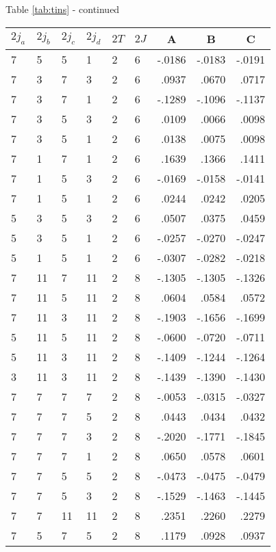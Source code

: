 \begin{center}{Table \ref{tab:tins} - continued}\end{center}
\clearpage
\small
\begin{center}
\begin{tabular}{llllllrrr}
\hline
$2j_{a}$&$2j_{b}$&$2j_{c}$&$2j_{d}$&$2T$&$2J$&
\multicolumn{1}{c}{A}&
\multicolumn{1}{c}{B}&
\multicolumn{1}{c}{C}
\\\hline
  7& 5& 5& 1& 2& 6&  -.0186&  -.0183&  -.0191\\
  7& 3& 7& 3& 2& 6&   .0937&   .0670&   .0717\\
  7& 3& 7& 1& 2& 6&  -.1289&  -.1096&  -.1137\\
  7& 3& 5& 3& 2& 6&   .0109&   .0066&   .0098\\
  7& 3& 5& 1& 2& 6&   .0138&   .0075&   .0098\\
  7& 1& 7& 1& 2& 6&   .1639&   .1366&   .1411\\
  7& 1& 5& 3& 2& 6&  -.0169&  -.0158&  -.0141\\
  7& 1& 5& 1& 2& 6&   .0244&   .0242&   .0205\\
  5& 3& 5& 3& 2& 6&   .0507&   .0375&   .0459\\
  5& 3& 5& 1& 2& 6&  -.0257&  -.0270&  -.0247\\
  5& 1& 5& 1& 2& 6&  -.0307&  -.0282&  -.0218\\
  7&11& 7&11& 2& 8&  -.1305&  -.1305&  -.1326\\
  7&11& 5&11& 2& 8&   .0604&   .0584&   .0572\\
  7&11& 3&11& 2& 8&  -.1903&  -.1656&  -.1699\\
  5&11& 5&11& 2& 8&  -.0600&  -.0720&  -.0711\\
  5&11& 3&11& 2& 8&  -.1409&  -.1244&  -.1264\\
  3&11& 3&11& 2& 8&  -.1439&  -.1390&  -.1430\\
  7& 7& 7& 7& 2& 8&  -.0053&  -.0315&  -.0327\\
  7& 7& 7& 5& 2& 8&   .0443&   .0434&   .0432\\
  7& 7& 7& 3& 2& 8&  -.2020&  -.1771&  -.1845\\
  7& 7& 7& 1& 2& 8&   .0650&   .0578&   .0601\\
  7& 7& 5& 5& 2& 8&  -.0473&  -.0475&  -.0479\\
  7& 7& 5& 3& 2& 8&  -.1529&  -.1463&  -.1445\\
  7& 7&11&11& 2& 8&   .2351&   .2260&   .2279\\
  7& 5& 7& 5& 2& 8&   .1179&   .0928&   .0937\\
\hline
\end{tabular}
\end{center}
